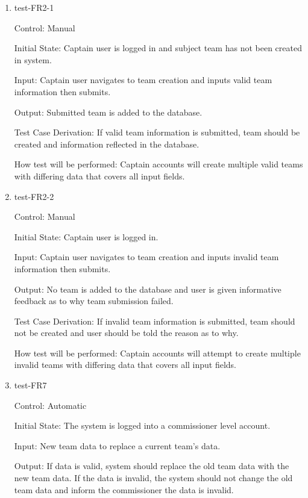 \documentclass[12pt, titlepage]{article}
\begin{document}
\begin{enumerate}

  \item{test-FR2-1\\}

  Control: Manual

  Initial State: Captain user is logged in and subject team has not been 
  created in system.

  Input: Captain user navigates to team creation and inputs valid team 
  information then submits. 

  Output: Submitted team is added to the database.

  Test Case Derivation: If valid team information is submitted, team
  should be created and information reflected in the database.

  How test will be performed: Captain accounts will create multiple
  valid teams with differing data that covers all input fields.

  \item{test-FR2-2\\}

  Control: Manual

  Initial State: Captain user is logged in.

  Input: Captain user navigates to team creation and inputs invalid team 
  information then submits. 

  Output: No team is added to the database and user is given informative 
  feedback as to why team submission failed.

  Test Case Derivation: If invalid team information is submitted, team
  should not be created and user should be told the reason as to why.

  How test will be performed: Captain accounts will attempt to create 
  multiple invalid teams with differing data that covers all input fields. 

  \item{test-FR7\\}

  Control: Automatic

  Initial State: The system is logged into a commissioner level account.

  Input: New team data to replace a current team's data.

  Output: If data is valid, system should replace the old team data with the new
  team data. If the data is invalid, the system should not change the old team
  data and inform the commissioner the data is invalid.


\end{enumerate}
\end{document}
